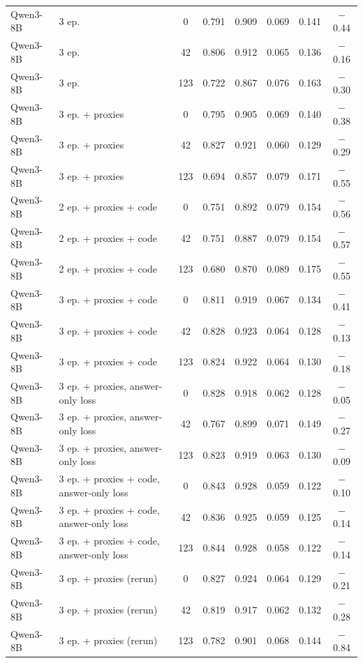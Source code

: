 \begin{table}[!htbp]
{\begin{tabular}{llcccccc}
Qwen3-8B & 3 ep. & 0 & 0.791 & 0.909 & 0.069 & 0.141 & $-$0.44 \\
Qwen3-8B & 3 ep. & 42 & 0.806 & 0.912 & 0.065 & 0.136 & $-$0.16 \\
Qwen3-8B & 3 ep. & 123 & 0.722 & 0.867 & 0.076 & 0.163 & $-$0.30 \\
\midrule
Qwen3-8B & 3 ep. + proxies & 0 & 0.795 & 0.905 & 0.069 & 0.140 & $-$0.38 \\
Qwen3-8B & 3 ep. + proxies & 42 & 0.827 & 0.921 & 0.060 & 0.129 & $-$0.29 \\
Qwen3-8B & 3 ep. + proxies & 123 & 0.694 & 0.857 & 0.079 & 0.171 & $-$0.55 \\
\midrule
Qwen3-8B & 2 ep. + proxies + code & 0 & 0.751 & 0.892 & 0.079 & 0.154 & $-$0.56 \\
Qwen3-8B & 2 ep. + proxies + code & 42 & 0.751 & 0.887 & 0.079 & 0.154 & $-$0.57 \\
Qwen3-8B & 2 ep. + proxies + code & 123 & 0.680 & 0.870 & 0.089 & 0.175 & $-$0.55 \\
\midrule
Qwen3-8B & 3 ep. + proxies + code & 0 & 0.811 & 0.919 & 0.067 & 0.134 & $-$0.41 \\
Qwen3-8B & 3 ep. + proxies + code & 42 & 0.828 & 0.923 & 0.064 & 0.128 & $-$0.13 \\
Qwen3-8B & 3 ep. + proxies + code & 123 & 0.824 & 0.922 & 0.064 & 0.130 & $-$0.18 \\
\midrule
Qwen3-8B & 3 ep. + proxies, answer-only loss & 0 & 0.828 & 0.918 & 0.062 & 0.128 & $-$0.05 \\
Qwen3-8B & 3 ep. + proxies, answer-only loss & 42 & 0.767 & 0.899 & 0.071 & 0.149 & $-$0.27 \\
Qwen3-8B & 3 ep. + proxies, answer-only loss & 123 & 0.823 & 0.919 & 0.063 & 0.130 & $-$0.09 \\
\midrule
Qwen3-8B & 3 ep. + proxies + code, answer-only loss & 0 & 0.843 & 0.928 & 0.059 & 0.122 & $-$0.10 \\
Qwen3-8B & 3 ep. + proxies + code, answer-only loss & 42 & 0.836 & 0.925 & 0.059 & 0.125 & $-$0.14 \\
Qwen3-8B & 3 ep. + proxies + code, answer-only loss & 123 & 0.844 & 0.928 & 0.058 & 0.122 & $-$0.14 \\
\midrule
Qwen3-8B & 3 ep. + proxies (rerun) & 0 & 0.827 & 0.924 & 0.064 & 0.129 & $-$0.21 \\
Qwen3-8B & 3 ep. + proxies (rerun) & 42 & 0.819 & 0.917 & 0.062 & 0.132 & $-$0.28 \\
Qwen3-8B & 3 ep. + proxies (rerun) & 123 & 0.782 & 0.901 & 0.068 & 0.144 & $-$0.84 \\

\end{tabular}}
\end{table}
